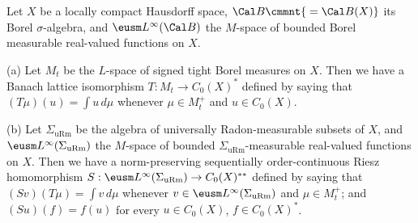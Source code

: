  Let $X$ be a locally compact Hausdorff space,
$\Cal B\cmmnt{\mskip5mu=\Cal B(X)}$
its Borel $\sigma$-algebra, and $\eusm L^{\infty}(\Cal B)$
the $M$-space of  bounded Borel measurable real-valued functions on $X$.

(a) Let $M_t$ be the $L$-space of signed tight Borel measures on $X$.
Then we have
a Banach lattice isomorphism $T:M_t\to C_0(X)^*$ defined by saying that
$(T\mu)(u)=\int u\,d\mu$ whenever $\mu\in M_t^+$ and $u\in C_0(X)$.

(b) Let $\Sigma_{\text{uRm}}$ be the algebra of universally
Radon-measurable subsets of $X$, and
$\eusm L^{\infty}(\Sigma_{\text{uRm}})$ the $M$-space of bounded
$\Sigma_{\text{uRm}}$-measurable real-valued functions on $X$.   Then we
have a norm-preserving sequentially order-continuous Riesz
homomorphism $S:\eusm L^{\infty}(\Sigma_{\text{uRm}})\to C_0(X)^{**}$
defined by saying that $(Sv)(T\mu)=\int v\,d\mu$ whenever
$v\in\eusm L^{\infty}(\Sigma_{\text{uRm}})$ and
$\mu\in M_t^+$;  and $(Su)(f)=f(u)$ for every $u\in C_0(X)$,
$f\in C_0(X)^*$.


